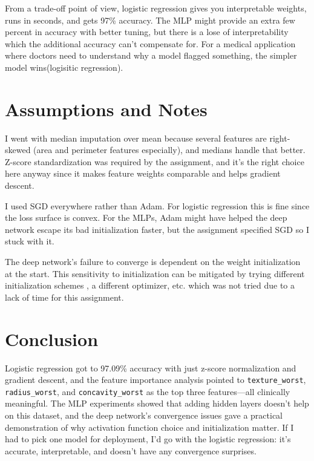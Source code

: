\documentclass[journal,onecolumn]{IEEEtran}
\begin{document}
From a trade-off point of view, logistic regression gives you interpretable weights, runs in seconds, and gets 97\% accuracy. The MLP might provide an extra few percent in accuracy with better tuning, but there is a lose of interpretability which the additional accuracy can't compensate for. For a medical application where doctors need to understand why a model flagged something, the simpler model wins(logisitic regression).

\section{Assumptions and Notes}

I went with median imputation over mean because several features are right-skewed (area and perimeter features especially), and medians handle that better. Z-score standardization was required by the assignment, and it's the right choice here anyway since it makes feature weights comparable and helps gradient descent.

I used SGD everywhere rather than Adam. For logistic regression this is fine since the loss surface is convex. For the MLPs, Adam might have helped the deep network escape its bad initialization faster, but the assignment specified SGD so I stuck with it.

The deep network's failure to converge is dependent on the weight initialization at the start. This sensitivity to initialization can be mitigated by trying different initialization schemes , a different optimizer, etc. which was not tried due to a lack of time for this assignment.

\section{Conclusion}

Logistic regression got to 97.09\% accuracy with just z-score normalization and gradient descent, and the feature importance analysis pointed to \texttt{texture\_worst}, \texttt{radius\_worst}, and \texttt{concavity\_worst} as the top three features---all clinically meaningful. The MLP experiments showed that adding hidden layers doesn't help on this dataset, and the deep network's convergence issues gave a practical demonstration of why activation function choice and initialization matter. If I had to pick one model for deployment, I'd go with the logistic regression: it's accurate, interpretable, and doesn't have any convergence surprises.
\end{document}

